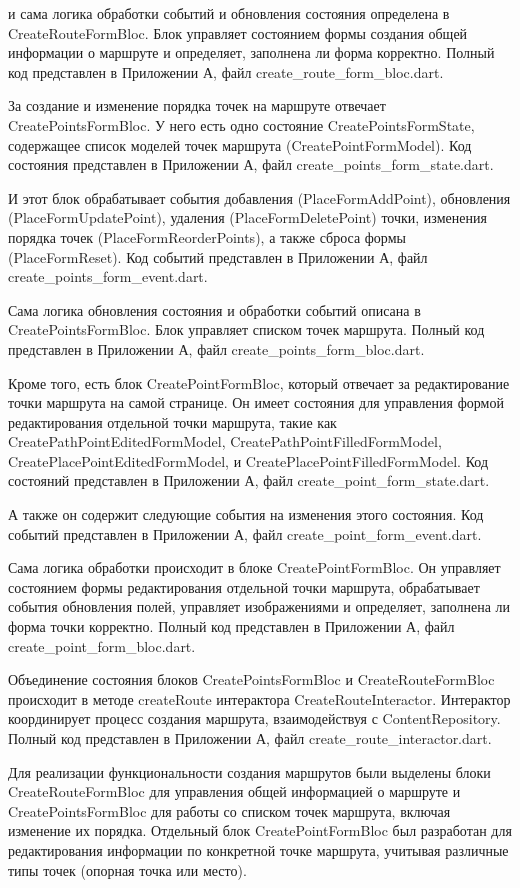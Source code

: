 и сама логика обработки событий и обновления состояния определена в CreateRouteFormBloc. Блок управляет состоянием формы создания общей информации о маршруте и определяет, заполнена ли форма корректно. Полный код представлен в Приложении А, файл create\_route\_form\_bloc.dart.

За создание и изменение порядка точек на маршруте отвечает CreatePointsFormBloc. У него есть одно состояние CreatePointsFormState, содержащее список моделей точек маршрута (CreatePointFormModel). Код состояния представлен в Приложении А, файл create\_points\_form\_state.dart.

И этот блок обрабатывает события добавления (PlaceFormAddPoint), обновления (PlaceFormUpdatePoint), удаления (PlaceFormDeletePoint) точки, изменения порядка точек (PlaceFormReorderPoints), а также сброса формы (PlaceFormReset). Код событий представлен в Приложении А, файл create\_points\_form\_event.dart.

Сама логика обновления состояния и обработки событий описана в CreatePointsFormBloc. Блок управляет списком точек маршрута. Полный код представлен в Приложении А, файл create\_points\_form\_bloc.dart.

Кроме того, есть блок CreatePointFormBloc, который отвечает за редактирование точки маршрута на самой странице. Он имеет состояния для управления формой редактирования отдельной точки маршрута, такие как CreatePathPointEditedFormModel, CreatePathPointFilledFormModel, CreatePlacePointEditedFormModel, и CreatePlacePointFilledFormModel. Код состояний представлен в Приложении А, файл create\_point\_form\_state.dart.

А также он содержит следующие события на изменения этого состояния. Код событий представлен в Приложении А, файл create\_point\_form\_event.dart.

Сама логика обработки происходит в блоке CreatePointFormBloc. Он управляет состоянием формы редактирования отдельной точки маршрута, обрабатывает события обновления полей, управляет изображениями и определяет, заполнена ли форма точки корректно. Полный код представлен в Приложении А, файл create\_point\_form\_bloc.dart.

Объединение состояния блоков CreatePointsFormBloc и CreateRouteFormBloc  происходит в методе createRoute интерактора CreateRouteInteractor. Интерактор координирует процесс создания маршрута, взаимодействуя с ContentRepository. Полный код представлен в Приложении А, файл create\_route\_interactor.dart.

Для реализации функциональности создания маршрутов были выделены блоки CreateRouteFormBloc  для управления общей информацией о маршруте и CreatePointsFormBloc  для работы со списком точек маршрута, включая изменение их порядка. Отдельный блок CreatePointFormBloc  был разработан для редактирования информации по конкретной точке маршрута, учитывая различные типы точек (опорная точка или место).  

